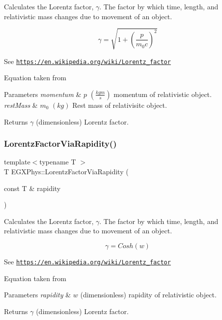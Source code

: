 Calculates the Lorentz factor, $\gamma$. The factor by which time, length, and relativistic mass changes due to movement of an object. 

\[\gamma=\sqrt{1+(\frac{p}{m_0 c})^2}\]

See \href{https://en.wikipedia.org/wiki/Lorentz_factor}{\tt https\+://en.\+wikipedia.\+org/wiki/\+Lorentz\+\_\+factor}

Equation taken from


\begin{DoxyParams}{Parameters}
{\em momentum} & $p$ $(\frac{kg m}{s})$ momentum of relativistic object. \\
\hline
{\em rest\+Mass} & $m_0$ $(kg)$ Rest mass of relativisitc object. \\
\hline
\end{DoxyParams}
\begin{DoxyReturn}{Returns}
$\gamma$ (dimensionless) Lorentz factor. 
\end{DoxyReturn}
\mbox{\label{group___e_g_x_phys-_lorentz_transformations_ga8064f5bce1d2ca5f7bc39d95ba4d2dd9}} 
\subsubsection{\texorpdfstring{Lorentz\+Factor\+Via\+Rapidity()}{LorentzFactorViaRapidity()}}
{\footnotesize\ttfamily template$<$typename T $>$ \\
T E\+G\+X\+Phys\+::\+Lorentz\+Factor\+Via\+Rapidity (\begin{DoxyParamCaption}\item[{const T \&}]{rapidity }\end{DoxyParamCaption})}



Calculates the Lorentz factor, $\gamma$. The factor by which time, length, and relativistic mass changes due to movement of an object. 

\[\gamma=Cosh(w)\]

See \href{https://en.wikipedia.org/wiki/Lorentz_factor}{\tt https\+://en.\+wikipedia.\+org/wiki/\+Lorentz\+\_\+factor}

Equation taken from


\begin{DoxyParams}{Parameters}
{\em rapidity} & $w$ (dimensionless) rapidity of relativistic object. \\
\hline
\end{DoxyParams}
\begin{DoxyReturn}{Returns}
$\gamma$ (dimensionless) Lorentz factor. 
\end{DoxyReturn}
